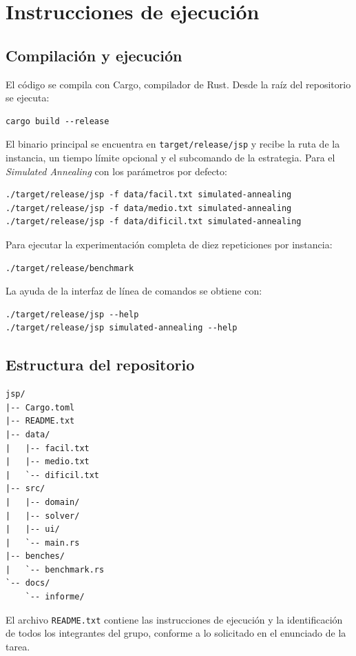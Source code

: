 \chapter{Instrucciones de ejecución}
\label{ch:anexo}

\section{Compilación y ejecución}

El código se compila con Cargo, compilador de Rust. Desde la raíz del repositorio se ejecuta:
\begin{verbatim}
cargo build --release
\end{verbatim}

El binario principal se encuentra en \texttt{target/release/jsp} y recibe la ruta de la instancia,
un tiempo límite opcional y el subcomando de la estrategia.
Para el \emph{Simulated Annealing} con los parámetros por defecto:
\begin{verbatim}
./target/release/jsp -f data/facil.txt simulated-annealing
./target/release/jsp -f data/medio.txt simulated-annealing
./target/release/jsp -f data/dificil.txt simulated-annealing
\end{verbatim}

Para ejecutar la experimentación completa de diez repeticiones por instancia:
\begin{verbatim}
./target/release/benchmark
\end{verbatim}

La ayuda de la interfaz de línea de comandos se obtiene con:
\begin{verbatim}
./target/release/jsp --help
./target/release/jsp simulated-annealing --help
\end{verbatim}

\section{Estructura del repositorio}

\begin{verbatim}
jsp/
|-- Cargo.toml
|-- README.txt
|-- data/
|   |-- facil.txt
|   |-- medio.txt
|   `-- dificil.txt
|-- src/
|   |-- domain/
|   |-- solver/
|   |-- ui/
|   `-- main.rs
|-- benches/
|   `-- benchmark.rs
`-- docs/
    `-- informe/
\end{verbatim}

El archivo \texttt{README.txt} contiene las instrucciones de ejecución y
la identificación de todos los integrantes del grupo,
conforme a lo solicitado en el enunciado de la tarea.

